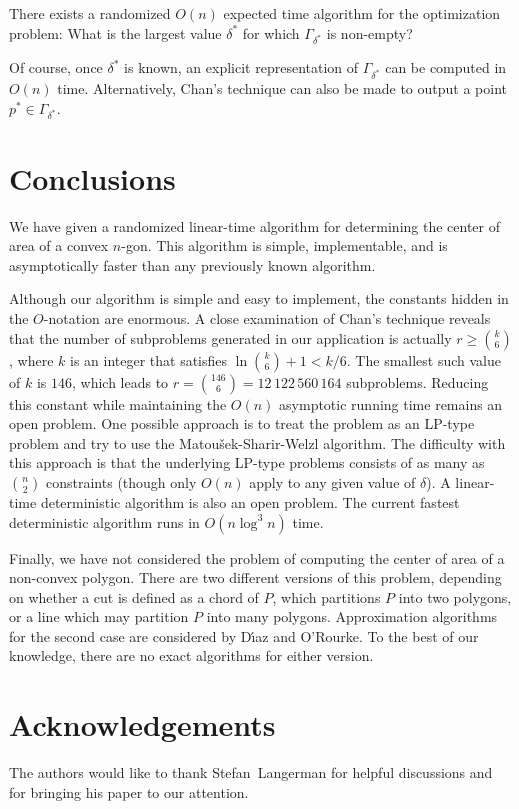 \documentclass{ws-ijcga}
\begin{document}
\begin{theorem}
There exists a randomized $O(n)$ expected time algorithm for the
optimization problem: What is the largest value $\delta^*$ for which
$\Gamma_{\delta^*}$ is non-empty?
\end{theorem}

Of course, once $\delta^*$ is known, an explicit representation of
$\Gamma_{\delta^*}$ can be computed in $O(n)$ time.  Alternatively,
Chan's technique can also be made to output a point
$p^*\in\Gamma_{\delta^*}$.\cite{c99}


\section{Conclusions}

We have given a randomized linear-time algorithm for determining the
center of area of a convex $n$-gon.  This algorithm is simple,
implementable, and is asymptotically faster than any previously known
algorithm.

Although our algorithm is simple and easy to implement, the constants
hidden in the $O$-notation are enormous.  A close examination of
Chan's technique reveals that the number of subproblems generated in
our application is actually $r\ge {k\choose 6}$, where $k$ is an
integer that satisfies $\ln {k\choose 6}+1 < k/6$. The smallest such
value of $k$ is $146$, which leads to $r={146\choose 6}=12\, 122\,
560\, 164$ subproblems.  Reducing this constant while maintaining the
$O(n)$ asymptotic running time remains an open problem.  One possible
approach is to treat the problem as an LP-type problem and try to use
the Matou\v sek-Sharir-Welzl algorithm.\cite{msw92}  The difficulty with
this approach is that the underlying LP-type problems consists of
as many as $n\choose 2$ constraints (though only $O(n)$ apply to any given value of
$\delta$).  A linear-time deterministic algorithm is also an open
problem. The current fastest deterministic algorithm runs in
$O(n\log^3 n)$ time.\cite{ls02}

Finally, we have not considered the problem of computing the center of
area of a non-convex polygon.  There are two different versions of
this problem, depending on whether a cut is defined as a chord of $P$,
which partitions $P$ into two polygons, or a line which may partition
$P$ into many polygons.  Approximation algorithms for the second case
are considered by D\'{\i}az and O'Rourke.\cite{do89}  To the best of
our knowledge, there are no exact algorithms for either version.


\section*{Acknowledgements}

The authors would like to thank Stefan~Langerman for helpful
discussions and for bringing his paper\cite{ls02} to our attention.



\end{document}
